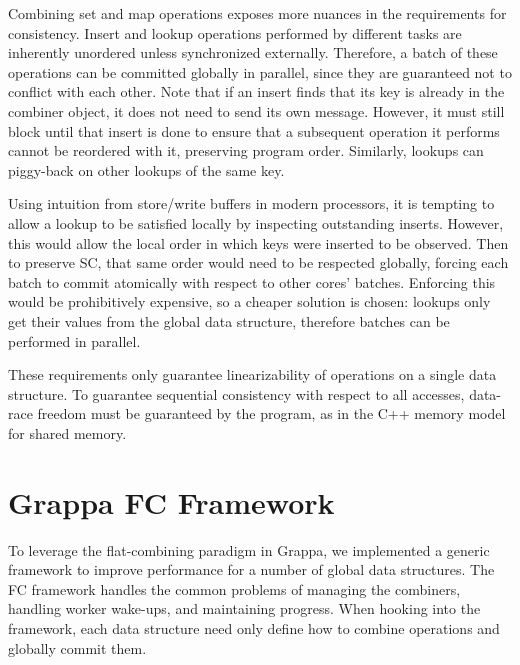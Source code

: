 Combining set and map operations exposes more nuances in the requirements for consistency.
Insert and lookup operations performed by different tasks are inherently unordered unless synchronized externally.
Therefore, a batch of these operations can be committed globally in parallel, since they are guaranteed not to conflict with each other.
Note that if an insert finds that its key is already in the combiner object, it does not need to send its own message. However, it must still block until that insert is done to ensure that a subsequent operation it performs cannot be reordered with it, preserving program order.
Similarly, lookups can piggy-back on other lookups of the same key.

Using intuition from store/write buffers in modern processors, it is tempting to allow a lookup to be satisfied locally by inspecting outstanding inserts.
However, this would allow the local order in which keys were inserted to be observed.
Then to preserve SC, that same order would need to be respected globally, forcing each batch to commit atomically with respect to other cores' batches. Enforcing this would be prohibitively expensive, so a cheaper solution is chosen: lookups only get their values from the global data structure, therefore batches can be performed in parallel.

These requirements only guarantee linearizability of operations on a single data structure. To guarantee sequential consistency with respect to all accesses, data-race freedom must be guaranteed by the program, as in the C++ memory model for shared memory.

\section{Grappa FC Framework}
To leverage the flat-combining paradigm in Grappa, we implemented a generic framework to improve performance for a number of global data structures. The FC framework handles the common problems of managing the combiners, handling worker wake-ups, and maintaining progress. When hooking into the framework, each data structure need only define how to combine operations and globally commit them.

